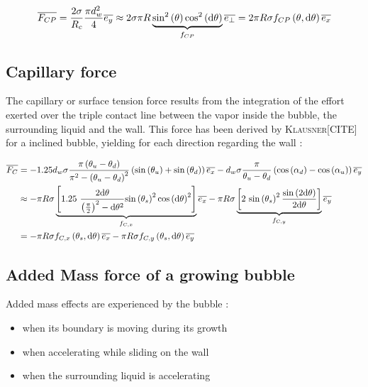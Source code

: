 \begin{align}
\overline{F_{CP}}&=\frac{2\sigma}{R_{c}}\frac{\pi d_{w}^{2}}{4}\overline{e_{y}} \approx 2\sigma \pi R \underbrace{\mathrm{sin}^{2}\left( \theta \right) \mathrm{cos}^{2}\left( \mathrm{d}\theta \right)}_{f_{CP}}\overline{e_{\bot}} =2\pi R \sigma f_{CP}\left( \theta, \mathrm{d}\theta \right)\overline{e_{x}}\\
\end{align}

\subsection{Capillary force}

The capillary or surface tension force results from the integration of the effort exerted over the triple contact line between the vapor inside the bubble, the surrounding liquid and the wall. This force has been derived by \textsc{Klausner}[CITE] for a inclined bubble, yielding for each direction regarding the wall :

\begin{align}
\vect{F_{C}}&=-1.25 d_{w}\sigma \frac{\pi\parth{\theta_{u}-\theta_{d}}}{\pi^{2}-\parth{\theta_{u}-\theta_{d}}^{2}}\parth{\sin{\theta_{u}}+\sin{\theta_{d}} }\vect{e_{x}} -d_{w} \sigma \frac{\pi}{\theta_{u}-\theta_{d}}\parth{\cos{\alpha_{d}}- \cos{\alpha_{u}}}\vect{e_{y}} \\
%
&\approx -\pi R \sigma \underbrace{\crocht{1.25\ \frac{2\dtheta}{\parth{\frac{\pi}{2}}^{2}-\dtheta^{2}}\sin{\theta_{s}}^{2}\cos{\dtheta}^{2}}}_{f_{C,x}} \vect{e_{x}} - \pi R \sigma \underbrace{\crocht{2\ \sin{\theta_{s}}^{2}\frac{\sin{2\dtheta}}{2\dtheta}}}_{f_{C,y}}\vect{e_{y}}\\
%
&= -\pi R \sigma f_{C,x}\parth{\theta_{s}, \dtheta}\vect{e_{x}} - \pi R \sigma f_{C,y}\parth{\theta_{s}, \dtheta} \vect{e_{y}}
\end{align}

\npar

\subsection{Added Mass force of a growing bubble}

Added mass effects are experienced by the bubble :

\begin{itemize}
\item when its boundary is moving during its growth
\item when accelerating while sliding on the wall 
\item when the surrounding liquid is accelerating
\end{itemize}

